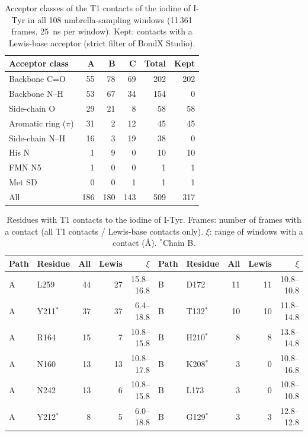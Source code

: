 \documentclass[journal=jcisd8,manuscript=suppinfo]{achemso}
\newcommand{\BX}{BondX Studio}
\begin{document}
\begin{singlespace}
\begin{table}[!htbp]
\caption{Acceptor classes of the T1 contacts of the iodine of I-Tyr in all 108 umbrella-sampling windows (11\,361 frames, 25~ns per window). Kept: contacts with a Lewis-base acceptor (strict filter of \BX{}).}
\label{tab:hiydclasses}
\centering\small
\begin{tabular}{lrrrrr}
\toprule
Acceptor class & A & B & C & Total & Kept \\
\midrule
Backbone C=O & 55 & 78 & 69 & 202 & 202 \\
Backbone N–H & 53 & 67 & 34 & 154 & 0 \\
Side-chain O & 29 & 21 & 8 & 58 & 58 \\
Aromatic ring ($\pi$) & 31 & 2 & 12 & 45 & 45 \\
Side-chain N–H & 16 & 3 & 19 & 38 & 0 \\
His N & 1 & 9 & 0 & 10 & 10 \\
FMN N5 & 1 & 0 & 0 & 1 & 1 \\
Met SD & 0 & 0 & 1 & 1 & 1 \\
\midrule
All & 186 & 180 & 143 & 509 & 317 \\
\bottomrule
\end{tabular}
\end{table}
\begin{table}[!htbp]
\caption{Residues with T1 contacts to the iodine of I-Tyr. Frames: number of frames with a contact (all T1 contacts / Lewis-base contacts only). $\xi$: range of windows with a contact (\AA). $^{*}$Chain B.}
\label{tab:hiydres}
\centering\footnotesize\setlength{\tabcolsep}{3pt}
\begin{tabular}{llrrr|llrrr}
\toprule
Path & Residue & All & Lewis & $\xi$ & Path & Residue & All & Lewis & $\xi$ \\
\midrule
A & L259 & 44 & 27 & 15.8--16.8 & B & D172 & 11 & 11 & 10.8--10.8 \\
A & Y211$^{*}$ & 37 & 37 & 6.4--18.8 & B & T132$^{*}$ & 10 & 10 & 11.8--14.8 \\
A & R164 & 15 & 7 & 10.8--15.8 & B & H210$^{*}$ & 8 & 8 & 13.8--14.8 \\
A & N160 & 13 & 13 & 10.8--17.8 & B & K208$^{*}$ & 3 & 0 & 10.8--16.8 \\
A & N242 & 13 & 6 & 10.8--15.8 & B & L173 & 3 & 0 & 10.8--10.8 \\
A & Y212$^{*}$ & 8 & 5 & 6.0--18.8 & B & G129$^{*}$ & 3 & 3 & 12.8--12.8 \\

\end{tabular}
\end{table}
\end{singlespace}
\end{document}
